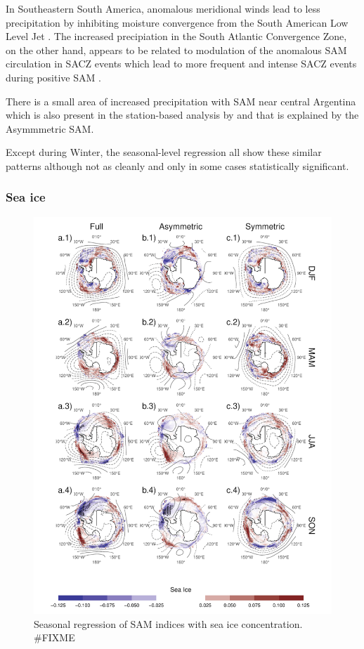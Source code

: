 \documentclass[]{ametsocV5}
\begin{document}
In Southeastern South America, anomalous meridional winds lead to less
precipitation by inhibiting moisture convergence from the South American
Low Level Jet \citep{silvestri2009}. The increased precipiation in the
South Atlantic Convergence Zone, on the other hand, appears to be
related to modulation of the anomalous SAM circulation in SACZ events
which lead to more frequent and intense SACZ events during positive SAM
\citep{rosso2018}.

There is a small area of increased precipitation with SAM near central
Argentina which is also present in the station-based analysis by
\citet{gillett2006} and that is explained by the Asymmmetric SAM.

Except during Winter, the seasonal-level regression all show these
similar patterns although not as cleanly and only in some cases
statistically significant.

\subsubsection{Sea ice}

\begin{figure}
\includegraphics{regr-ice-1} \caption[Seasonal regression of SAM indices with sea ice concentration]{Seasonal regression of SAM indices with sea ice concentration. \#FIXME}\label{fig:regr-ice}
\end{figure}
\end{document}

